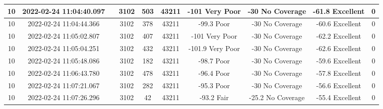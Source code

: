\begin{longtable*}{|c|c|c|c|c|c|c|c|c|c|}
10&2022-02-24 11:04:40.097&&3102&503&43211& -101      Very Poor   & -30       No Coverage & -61.8     Excellent   & 0\\\hline
{}10&2022-02-24 11:04:44.366&&3102&378&43211& -99.3     Poor        & -30       No Coverage & -60.6     Excellent   & 0\\\hline
{}10&2022-02-24 11:05:02.807&&3102&407&43211& -101      Very Poor   & -30       No Coverage & -62.2     Excellent   & 0\\\hline
{}10&2022-02-24 11:05:04.251&&3102&432&43211& -101.9    Very Poor   & -30       No Coverage & -62.6     Excellent   & 0\\\hline
{}10&2022-02-24 11:05:48.086&&3102&182&43211& -98.7     Poor        & -30       No Coverage & -59.6     Excellent   & 0\\\hline
{}10&2022-02-24 11:06:43.780&&3102&478&43211& -96.4     Poor        & -30       No Coverage & -57.8     Excellent   & 0\\\hline
{}10&2022-02-24 11:07:21.067&&3102&282&43211& -95.3     Poor        & -30       No Coverage & -56.6     Excellent   & 0\\\hline
{}10&2022-02-24 11:07:26.296&&3102&42&43211& -93.2     Fair        & -25.2     No Coverage & -55.4     Excellent   & 0\\\hline

\end{longtable*}
